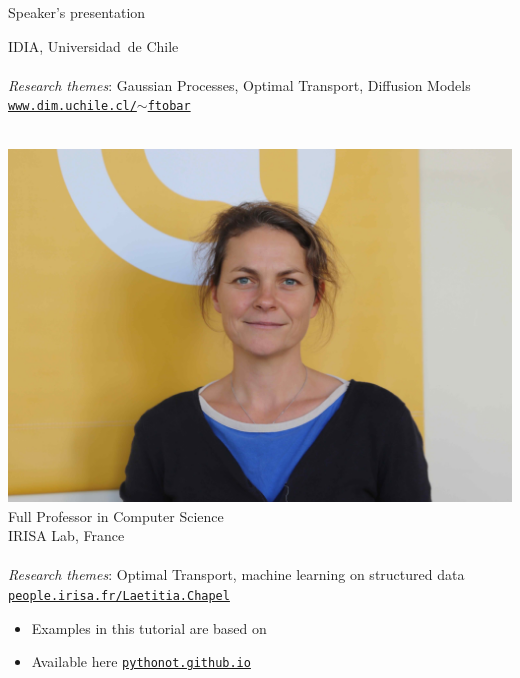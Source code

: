 \documentclass[pdf,aspectratio=169,10pt]{beamer}
\begin{document}
\begin{frame}{Speaker's presentation}
\begin{minipage}{0.45\textwidth}
IDIA, Universidad~de Chile\\
~\\
\emph{Research themes}: Gaussian Processes, Optimal Transport, Diffusion Models\\
\href{https://www.dim.uchile.cl/~ftobar/}{\texttt{www.dim.uchile.cl/$\sim$ftobar}}
\end{minipage}
\begin{minipage}{0.45\textwidth}
    \centering
    \\
\includegraphics[trim={50cm 15cm 45cm 12cm},clip,height=0.2\textheight]{../img/LC_light.jpg}\\
Full Professor in Computer Science\\
IRISA Lab, France\\
~\\
\emph{Research themes}: Optimal Transport, machine learning on structured data \\
\href{https://people.irisa.fr/Laetitia.Chapel/}{\texttt{people.irisa.fr/Laetitia.Chapel}}
\end{minipage}

\vspace{1em}
\begin{itemize}
    \item Examples in this tutorial are based on 
    \item Available here \href{https://pythonot.github.io/}{\texttt{pythonot.github.io}}
\end{itemize}
\end{frame}
\end{document}
